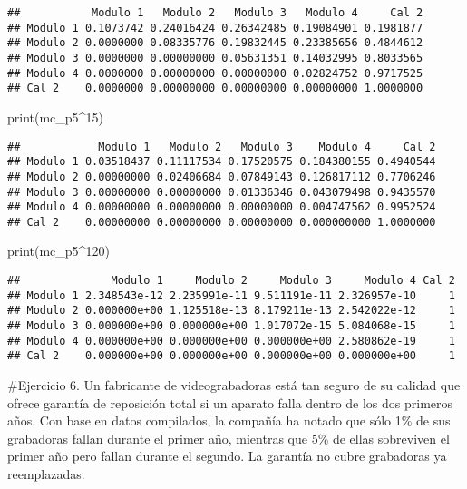 \documentclass[
]{article}
\newenvironment{Shaded}{\begin{snugshade}}{\end{snugshade}}
\newcommand{\DecValTok}[1]{\textcolor[rgb]{0.00,0.00,0.81}{#1}}
\newcommand{\FunctionTok}[1]{\textcolor[rgb]{0.00,0.00,0.00}{#1}}
\newcommand{\NormalTok}[1]{#1}
\newcommand{\SpecialCharTok}[1]{\textcolor[rgb]{0.00,0.00,0.00}{#1}}
\begin{document}
\begin{verbatim}
##           Modulo 1   Modulo 2   Modulo 3   Modulo 4     Cal 2
## Modulo 1 0.1073742 0.24016424 0.26342485 0.19084901 0.1981877
## Modulo 2 0.0000000 0.08335776 0.19832445 0.23385656 0.4844612
## Modulo 3 0.0000000 0.00000000 0.05631351 0.14032995 0.8033565
## Modulo 4 0.0000000 0.00000000 0.00000000 0.02824752 0.9717525
## Cal 2    0.0000000 0.00000000 0.00000000 0.00000000 1.0000000
\end{verbatim}

\begin{Shaded}
\begin{Highlighting}[]
\FunctionTok{print}\NormalTok{(mc\_p5}\SpecialCharTok{\^{}}\DecValTok{15}\NormalTok{)}
\end{Highlighting}
\end{Shaded}

\begin{verbatim}
##            Modulo 1   Modulo 2   Modulo 3    Modulo 4     Cal 2
## Modulo 1 0.03518437 0.11117534 0.17520575 0.184380155 0.4940544
## Modulo 2 0.00000000 0.02406684 0.07849143 0.126817112 0.7706246
## Modulo 3 0.00000000 0.00000000 0.01336346 0.043079498 0.9435570
## Modulo 4 0.00000000 0.00000000 0.00000000 0.004747562 0.9952524
## Cal 2    0.00000000 0.00000000 0.00000000 0.000000000 1.0000000
\end{verbatim}

\begin{Shaded}
\begin{Highlighting}[]
\FunctionTok{print}\NormalTok{(mc\_p5}\SpecialCharTok{\^{}}\DecValTok{120}\NormalTok{)}
\end{Highlighting}
\end{Shaded}

\begin{verbatim}
##              Modulo 1     Modulo 2     Modulo 3     Modulo 4 Cal 2
## Modulo 1 2.348543e-12 2.235991e-11 9.511191e-11 2.326957e-10     1
## Modulo 2 0.000000e+00 1.125518e-13 8.179211e-13 2.542022e-12     1
## Modulo 3 0.000000e+00 0.000000e+00 1.017072e-15 5.084068e-15     1
## Modulo 4 0.000000e+00 0.000000e+00 0.000000e+00 2.580862e-19     1
## Cal 2    0.000000e+00 0.000000e+00 0.000000e+00 0.000000e+00     1
\end{verbatim}

\#Ejercicio 6. Un fabricante de videograbadoras está tan seguro de su
calidad que ofrece garantía de reposición total si un aparato falla
dentro de los dos primeros años. Con base en datos compilados, la
compañía ha notado que sólo 1\% de sus grabadoras fallan durante el
primer año, mientras que 5\% de ellas sobreviven el primer año pero
fallan durante el segundo. La garantía no cubre grabadoras ya
reemplazadas.
\end{document}
